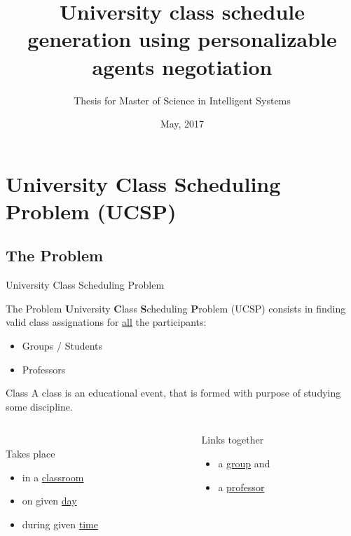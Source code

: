 \documentclass{beamer}
\title{University class schedule generation using personalizable agents negotiation}
\subtitle{Thesis for Master of Science in Intelligent Systems}
\institute[ITESM]{Tecnol\'{o}gico de Monterrey}
\date{May, 2017}
\begin{document}
\frame{\titlepage}
\frame{\tableofcontents} %

\section{University Class Scheduling Problem (UCSP)}
\subsection{The Problem}

\begin{frame}{University Class Scheduling Problem}
  \begin{block}{The Problem}
    \textbf{U}niversity \textbf{C}lass \textbf{S}cheduling \textbf{P}roblem (UCSP)
    consists in finding valid \alert{class} assignations for \underline{all} the
    participants:
    \begin{itemize}
      \item Groups / Students
      \item Professors
    \end{itemize}
  \end{block}
  \begin{block}{Class}
    A class is an educational event, that is formed with purpose of studying
    some \alert{discipline}.
    \begin{columns}
      \begin{column}{4cm}
        \\Takes place
        \begin{itemize}
          \item in a \underline{classroom}
          \item on given \underline{day}
          \item during given \underline{time}
        \end{itemize}
      \end{column}
      \begin{column}{3cm}
        Links together
        \begin{itemize}
          \item a \underline{group} and
          \item a \underline{professor}
        \end{itemize}
      \end{column}
    \end{columns}

  \end{block}
\end{frame}
\end{document}
